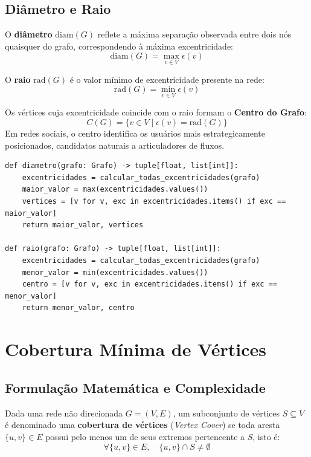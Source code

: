 \documentclass[12pt,a4paper]{article}
\begin{document}
\subsection{Diâmetro e Raio}
O \textbf{diâmetro} $\text{diam}(G)$ reflete a máxima separação observada entre dois nós quaisquer do grafo, correspondendo à máxima excentricidade:
\begin{equation}
    \text{diam}(G) = \max_{v \in V} \epsilon(v)
\end{equation}

O \textbf{raio} $\text{rad}(G)$ é o valor mínimo de excentricidade presente na rede:
\begin{equation}
    \text{rad}(G) = \min_{v \in V} \epsilon(v)
\end{equation}

Os vértices cuja excentricidade coincide com o raio formam o \textbf{Centro do Grafo}:
\begin{equation}
    C(G) = \{v \in V \mid \epsilon(v) = \text{rad}(G)\}
\end{equation}
Em redes sociais, o centro identifica os usuários mais estrategicamente posicionados, candidatos naturais a articuladores de fluxos.

\begin{lstlisting}[caption={Cálculo de Diâmetro e Raio em \texttt{metricas.py}}, label={cod:metricas}]
def diametro(grafo: Grafo) -> tuple[float, list[int]]:
    excentricidades = calcular_todas_excentricidades(grafo)
    maior_valor = max(excentricidades.values())
    vertices = [v for v, exc in excentricidades.items() if exc == maior_valor]
    return maior_valor, vertices

def raio(grafo: Grafo) -> tuple[float, list[int]]:
    excentricidades = calcular_todas_excentricidades(grafo)
    menor_valor = min(excentricidades.values())
    centro = [v for v, exc in excentricidades.items() if exc == menor_valor]
    return menor_valor, centro
\end{lstlisting}

\section{Cobertura Mínima de Vértices}

\subsection{Formulação Matemática e Complexidade}
Dada uma rede não direcionada $G = (V, E)$, um subconjunto de vértices $S \subseteq V$ é denominado uma \textbf{cobertura de vértices} (\textit{Vertex Cover}) se toda aresta $\{u, v\} \in E$ possui pelo menos um de seus extremos pertencente a $S$, isto é:
\begin{equation}
    \forall \{u, v\} \in E, \quad \{u, v\} \cap S \neq \emptyset
\end{equation}
\end{document}
